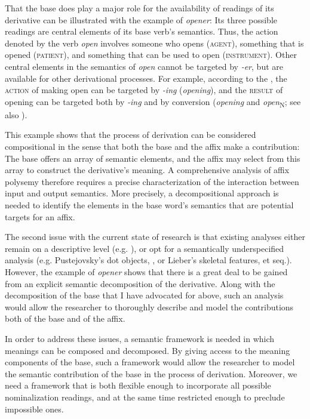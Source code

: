 That the base does play a major role for the availability of readings of its derivative can be illustrated with the example of \textit{opener}: Its three possible readings are central elements of its base verb's semantics. Thus, the action denoted by the verb \textit{open} involves someone who opens (\textsc{agent}), something that is opened (\textsc{patient}), and something that can be used to open (\textsc{instrument}).
Other central elements in the semantics of \textit{open} cannot be targeted by \textit{-er}, but are available for other derivational processes. For example, according to the , the \textsc{action} of making open can be targeted by \textit{-ing} (\textit{opening}), and the \textsc{result} of opening can be targeted both by \textit{-ing} and by conversion (\textit{opening} and \textit{open}\textsubscript{N}; see also \citealt{Andreou.2020}). 


This example shows that the process of derivation can be considered compositional in the sense that both the base and the affix make a contribution: The base offers an array of semantic elements, and the affix may select from this array to construct the derivative's meaning. A comprehensive analysis of affix polysemy therefore requires a precise characterization of the interaction between input and output semantics. More precisely, a decompositional approach is needed to identify the elements in the base word's semantics that are potential targets for an affix. 


The second issue with the current state of research is that existing analyses either remain on a descriptive level (e.g. \citealt{Bauer.2013}), or opt for a semantically underspecified analysis (e.g. Pustejovsky's dot objects, \citealt{Pustejovsky.1998}, or Lieber's skeletal features, \citealt{Lieber.2004} et seq.).
However, the example of \textit{opener} shows that there is a great deal to be gained from an explicit semantic decomposition of the derivative. Along with the decomposition of the base that I have advocated for above, such an analysis would allow the researcher to thoroughly describe and model the contributions both of the base and of the affix. 

In order to address these issues, a semantic framework is needed in which meanings can be composed and decomposed. By giving access to the meaning components of the base, such a framework would allow the researcher to model the semantic contribution of the base in the process of derivation. Moreover, we need a framework that is both flexible enough to incorporate all possible nominalization readings, and at the same time restricted enough to preclude impossible ones. 

